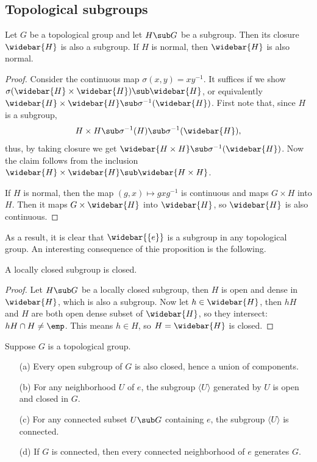 \subsection{Topological subgroups}
\begin{proposition}\label{topological group subgroup closure}
Let $G$ be a topological group and let $H\sub G$ be a subgroup. Then its closure $\widebar{H}$ is also a subgroup. If $H$ is normal, then $\widebar{H}$ is also normal.
\end{proposition}
\begin{proof}
Consider the continuous map $\sigma(x,y)=xy^{-1}$. It suffices if we show $\sigma(\widebar{H}\times\widebar{H})\sub\widebar{H}$, or equivalently $\widebar{H}\times\widebar{H}\sub \sigma^{-1}(\widebar{H})$. First note that, since $H$ is a subgroup,
\[H\times H\sub \sigma^{-1}(H)\sub \sigma^{-1}(\widebar{H}),\]
thus, by taking closure we get $\widebar{H\times H}\sub \sigma^{-1}(\widebar{H})$. Now the claim follows from the inclusion $\widebar{H}\times\widebar{H}\sub\widebar{H\times H}$.\par
If $H$ is normal, then the map $(g,x)\mapsto gxg^{-1}$ is continuous and maps $G\times H$ into $H$. Then it maps $G\times\widebar{H}$ into $\widebar{H}$, so $\widebar{H}$ is also continuous. 
\end{proof}
As a result, it is clear that $\widebar{\{e\}}$ is a subgroup in any topological group. An interesting consequence of thie proposition is the following.
\begin{corollary}
A locally closed subgroup is closed.
\end{corollary}
\begin{proof}
Let $H\sub G$ be a locally closed subgroup, then $H$ is open and dense in $\widebar{H}$, which is also a subgroup. Now let $h\in\widebar{H}$, then $hH$ and $H$ are both open dense subset of $\widebar{H}$, so they intersect: $hH\cap H\neq\emp$. This means $h\in H$, so $H=\widebar{H}$ is closed.
\end{proof}
\begin{proposition}\label{topological group subgroup prop}
Suppose $G$ is a topological group.
\begin{itemize}
\item[(a)] Every open subgroup of $G$ is also closed, hence a union of components.
\item[(b)] For any neighborhood $U$ of $e$, the subgroup $\langle U\rangle$ generated by $U$ is open and closed in $G$.
\item[(c)] For any connected subset $U\sub G$ containing $e$, the subgroup $\langle U\rangle$ is connected.
\item[(d)] If $G$ is connected, then every connected neighborhood of $e$ generates $G$.
\end{itemize}
\end{proposition}

